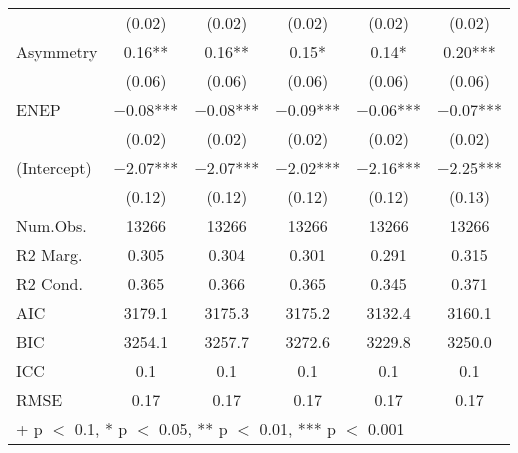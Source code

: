 \begin{table}
\begin{tabular}[t]{lccccc}
 & (\num{0.02}) & (\num{0.02}) & (\num{0.02}) & (\num{0.02}) & \vphantom{1} (\num{0.02})\\
Asymmetry & \num{0.16}** & \num{0.16}** & \num{0.15}* & \num{0.14}* & \num{0.20}***\\
 & (\num{0.06}) & (\num{0.06}) & (\num{0.06}) & (\num{0.06}) & (\num{0.06})\\
ENEP & \num{-0.08}*** & \num{-0.08}*** & \num{-0.09}*** & \num{-0.06}*** & \num{-0.07}***\\
 & (\num{0.02}) & (\num{0.02}) & (\num{0.02}) & (\num{0.02}) & (\num{0.02})\\
(Intercept) & \num{-2.07}*** & \num{-2.07}*** & \num{-2.02}*** & \num{-2.16}*** & \num{-2.25}***\\
 & (\num{0.12}) & (\num{0.12}) & (\num{0.12}) & (\num{0.12}) & (\num{0.13})\\
\midrule
Num.Obs. & \num{13266} & \num{13266} & \num{13266} & \num{13266} & \num{13266}\\
R2 Marg. & \num{0.305} & \num{0.304} & \num{0.301} & \num{0.291} & \num{0.315}\\
R2 Cond. & \num{0.365} & \num{0.366} & \num{0.365} & \num{0.345} & \num{0.371}\\
AIC & \num{3179.1} & \num{3175.3} & \num{3175.2} & \num{3132.4} & \num{3160.1}\\
BIC & \num{3254.1} & \num{3257.7} & \num{3272.6} & \num{3229.8} & \num{3250.0}\\
ICC & \num{0.1} & \num{0.1} & \num{0.1} & \num{0.1} & \num{0.1}\\
RMSE & \num{0.17} & \num{0.17} & \num{0.17} & \num{0.17} & \num{0.17}\\
\bottomrule
\multicolumn{6}{l}{\rule{0pt}{1em}+ p $<$ 0.1, * p $<$ 0.05, ** p $<$ 0.01, *** p $<$ 0.001}\\
\end{tabular}
\end{table}
